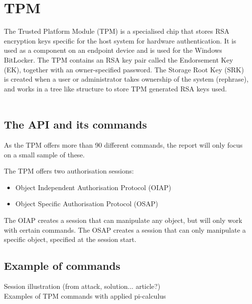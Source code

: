 \section{TPM}
The Trusted Platform Module (TPM) is a specialised chip that stores RSA encryption keys specific for the host system for hardware authentication. It is used as a component on an endpoint device and is used for the Windows BitLocker.
The TPM contains an RSA key pair called the Endorsement Key (EK), together with an owner-specified password. The Storage Root Key (SRK) is created when a user or administrator takes ownership of the system (rephrase), and works in a tree like structure to store TPM generated RSA keys used. \\ \\

\subsection{The API and its commands}
As the TPM offers more than 90 different commands, the report will only focus on a small sample of these. 

The TPM offers two authorisation sessions:
\begin{itemize}
  \item Object Independent Authorisation Protocol (OIAP)
  \item Object Specific Authorisation Protocol (OSAP)
\end{itemize}
The OIAP creates a session that can manipulate any object, but will only work with certain commands. The OSAP creates a session that can only manipulate a specific object, specified at the session start.

\subsection{Example of commands}
Session illustration (from attack, solution... article?) \\
Examples of TPM commands with applied pi-calculus

